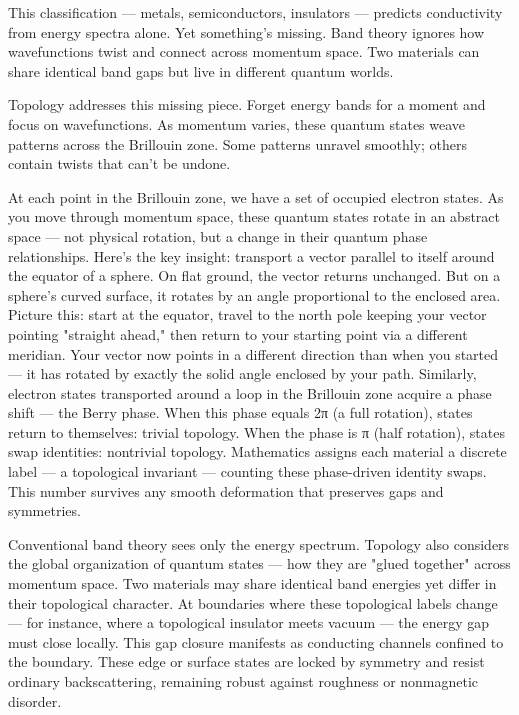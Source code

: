This classification — metals, semiconductors, insulators — predicts conductivity from energy spectra alone. Yet something's missing. Band theory ignores how wavefunctions twist and connect across momentum space. Two materials can share identical band gaps but live in different quantum worlds.

Topology addresses this missing piece. Forget energy bands for a moment and focus on wavefunctions. As momentum varies, these quantum states weave patterns across the Brillouin zone. Some patterns unravel smoothly; others contain twists that can't be undone. 

At each point in the Brillouin zone, we have a set of occupied electron states. As you move through momentum space, these quantum states rotate in an abstract space — not physical rotation, but a change in their quantum phase relationships. Here's the key insight: transport a vector parallel to itself around the equator of a sphere. On flat ground, the vector returns unchanged. But on a sphere's curved surface, it rotates by an angle proportional to the enclosed area. Picture this: start at the equator, travel to the north pole keeping your vector pointing "straight ahead," then return to your starting point via a different meridian. Your vector now points in a different direction than when you started — it has rotated by exactly the solid angle enclosed by your path. Similarly, electron states transported around a loop in the Brillouin zone acquire a phase shift — the Berry phase. When this phase equals 2π (a full rotation), states return to themselves: trivial topology. When the phase is π (half rotation), states swap identities: nontrivial topology. Mathematics assigns each material a discrete label — a topological invariant — counting these phase-driven identity swaps. This number survives any smooth deformation that preserves gaps and symmetries.

Conventional band theory sees only the energy spectrum. Topology also considers the global organization of quantum states — how they are "glued together" across momentum space. Two materials may share identical band energies yet differ in their topological character. At boundaries where these topological labels change — for instance, where a topological insulator meets vacuum — the energy gap must close locally. This gap closure manifests as conducting channels confined to the boundary. These edge or surface states are locked by symmetry and resist ordinary backscattering, remaining robust against roughness or nonmagnetic disorder.

